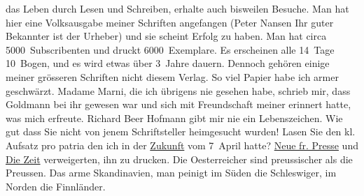 \begin{ledgroupsized}[t]{13cm}
                    das Leben {\pb}durch Lesen und
                    Schreiben, erhalte auch bisweilen Besuche. Man hat hier eine Volksausgabe meiner Schriften angefangen
                        (Peter Nansen Ihr guter Bekannter ist der
                    Urheber) und sie scheint Erfolg zu haben. Man hat circa 5000 Subscribenten und
                    druckt 6000 Exemplare. Es erscheinen alle 14 Tage 10 Bogen, und es wird etwas
                    über 3 Jahre dauern. Dennoch gehören einige meiner grösseren Schriften nicht
                    diesem Verlag. So viel Papier habe ich armer geschwärzt.\pend
           \pstart
           Madame Marni, die ich übrigens nie gesehen
                    habe, schrieb mir, dass Goldmann bei ihr
                    gewesen war und sich mit Freundschaft meiner erinnert hatte, was mich erfreute.
                        Richard Beer Hofmann gibt mir nie {\pb}ein Lebenszeichen.\pend
           \pstart
           Wie gut dass Sie nicht von jenem Schriftsteller heimgesucht wurden! Lasen Sie den
                    kl. Aufsatz pro patria den
                    ich in der \uline{Zukunft} vom 7 April hatte?
                        \uline{Neue fr. Presse} und \uline{Die Zeit} verweigerten, ihn zu drucken.
                    Die Oesterreicher
               sind preussischer als die Preussen. Das arme Skandinavien, man peinigt im Süden die Schleswiger, im Norden die Finnländer.\pend

\end{ledgroupsized}
